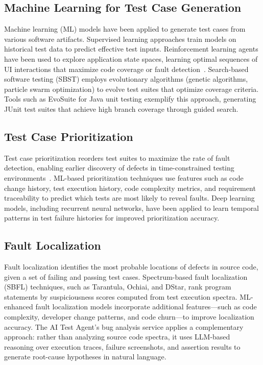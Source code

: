 \subsection{Machine Learning for Test Case Generation}
\label{subsec:ml_test_gen}

Machine learning (ML) models have been applied to generate test cases
from various software artifacts. Supervised learning approaches train
models on historical test data to predict effective test inputs.
Reinforcement learning agents have been used to explore application
state spaces, learning optimal sequences of UI interactions that
maximize code coverage or fault detection~\cite{aniche2022testing}.
Search-based software testing (SBST) employs evolutionary algorithms
(genetic algorithms, particle swarm optimization) to evolve test suites
that optimize coverage criteria. Tools such as EvoSuite for Java unit
testing exemplify this approach, generating JUnit test suites that
achieve high branch coverage through guided search.

\subsection{Test Case Prioritization}
\label{subsec:test_prioritization}

Test case prioritization reorders test suites to maximize the rate of
fault detection, enabling earlier discovery of defects in time-constrained
testing environments~\cite{istqb2023}. ML-based prioritization
techniques use features such as code change history, test execution
history, code complexity metrics, and requirement traceability to predict
which tests are most likely to reveal faults. Deep learning models,
including recurrent neural networks, have been applied to learn temporal
patterns in test failure histories for improved prioritization accuracy.

\subsection{Fault Localization}
\label{subsec:fault_localization}

Fault localization identifies the most probable locations of defects in
source code, given a set of failing and passing test cases.
Spectrum-based fault localization (SBFL) techniques, such as Tarantula,
Ochiai, and DStar, rank program statements by suspiciousness scores
computed from test execution spectra. ML-enhanced fault localization
models incorporate additional features---such as code complexity,
developer change patterns, and code churn---to improve localization
accuracy. The AI Test Agent's bug analysis service applies a
complementary approach: rather than analyzing source code spectra, it
uses LLM-based reasoning over execution traces, failure screenshots, and
assertion results to generate root-cause hypotheses in natural language.


